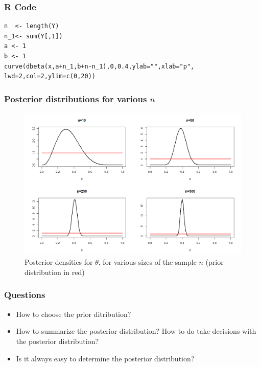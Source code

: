 \begin{frame}[fragile]\frametitle{R Code}

\begin{verbatim}
n  <- length(Y)
n_1<- sum(Y[,1])
a <- 1
b <- 1 
curve(dbeta(x,a+n_1,b+n-n_1),0,0.4,ylab="",xlab="p",
lwd=2,col=2,ylim=c(0,20))
\end{verbatim}

\end{frame}
\begin{frame}\frametitle{Posterior distributions for various $n$ }
     \begin{figure}
 \centering
 \includegraphics[width=\linewidth]{figures/post_priorunif.png}
\caption{\scriptsize Posterior densities for $\theta$,  for various sizes of the sample $n$ (prior distribution in red)}
  \end{figure}
 \end{frame}




\begin{frame}\frametitle{Questions}

\begin{itemize}
 \item How to choose the prior ditribution?  
 \item  How to summarize the posterior distribution? How to do take decisions with the posterior distribution?
 \item Is it always easy to determine the posterior distribution? 
\end{itemize}

 
\end{frame}

